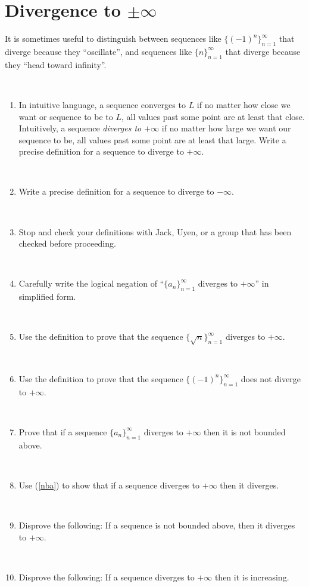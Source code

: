 \documentclass[12pt]{amsart}
\begin{document}
	
	\thispagestyle{empty}
	
	\section*{Divergence to $\pm \infty$}
	
\noindent It is sometimes useful to distinguish between sequences like $\{(-1)^n\}_{n=1}^\infty$
that diverge because they ``oscillate'', and sequences like $
\{n\}_{n=1}^\infty$
that diverge because they ``head toward infinity''.

\


\begin{enumerate}

\item In intuitive language, a sequence converges to $L$ if no matter how close we want or sequence to be to $L$, all values past some point are at least that close. Intuitively, a sequence \emph{diverges to $+\infty$} if no matter how large we want our sequence to be, all values past some point are at least that large. Write a precise definition for a sequence to diverge to $+\infty$.

\

\item Write a precise definition for a sequence to diverge to $-\infty$.

\

\item Stop and check your definitions with Jack, Uyen, or a group that has been checked before proceeding.

\

\item Carefully write the logical negation of ``$\{ a_n\}_{n=1}^\infty$ diverges to $+\infty$'' in simplified form.

\

\item Use the definition to prove that the sequence $\{ \sqrt{n} \}_{n=1}^\infty$ diverges to $+\infty$.

\

\item Use the definition to prove that the sequence $\{ (-1)^n\}_{n=1}^\infty$ does not diverge to $+ \infty$.

\

\item\label{nba} Prove that if a sequence $\{ a_n\}_{n=1}^\infty$ diverges to $+\infty$ then it is not bounded above. 

\

\item Use (\ref{nba}) to show that if a sequence diverges to $+\infty$ then it diverges.

\

\item Disprove the following: If a sequence is not bounded above, then it diverges to $+\infty$.

\

\item Disprove the following: If a sequence diverges to $+\infty$ then it is increasing.


\end{enumerate}
\end{document}
